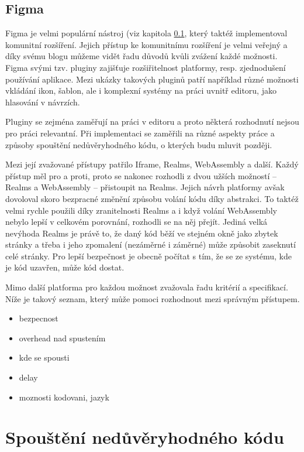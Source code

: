 \subsection{Figma}\label{text:figma}

Figma je velmi populární nástroj (viz kapitola \ref{text:figma}, který taktéž implementoval komunitní rozšíření.
Jejich přístup ke komunitnímu rozšíření je velmi veřejný a díky svému blogu můžeme vidět řadu důvodů kvůli zvážení každé možnosti.
Figma svými tzv. pluginy zajišťuje rozšiřitelnost platformy, resp. zjednodušení používání aplikace.
Mezi ukázky takových pluginů patří například různé možnosti vkládání ikon, šablon, ale i komplexní systémy na práci uvnitř editoru, jako hlasování v návrzích.

Pluginy se zejména zaměřují na práci v editoru a proto některá rozhodnutí nejsou pro práci relevantní.
Při implementaci se zaměřili na různé aspekty práce a způsoby spouštění nedůvěryhodného kódu, o kterých budu mluvit později.

Mezi její zvažované přístupy patřilo Iframe, Realms, WebAssembly a další.
Každý přístup měl pro a proti, proto se nakonec rozhodli z dvou užších možností -- Realms a WebAssembly -- přistoupit na Realms.
Jejich návrh platformy avšak dovoloval skoro bezpracné změnění způsobu volání kódu díky abstrakci.
To taktéž velmi rychle použili díky zranitelnosti Realms a i když volání WebAssembly nebylo lepší v celkovém porovnání, rozhodli se na něj přejít.
Jediná velká nevýhoda Realms je právě to, že daný kód běží ve stejném okně jako zbytek stránky a třeba i jeho zpomalení (nezáměrné i záměrné) může způsobit zaseknutí celé stránky.
Pro lepší bezpečnost je obecně počítat s tím, že se ze systému, kde je kód uzavřen, může kód dostat.

Mimo další platforma pro každou možnost zvažovala řadu kritérií a specifikací. 
Níže je takový seznam, který může pomoci rozhodnout mezi správným přístupem.

\begin{itemize}
    \item bezpecnost
    \item overhead nad spustením
    \item kde se spousti
    \item delay
    \item moznosti kodovani, jazyk
\end{itemize}

\section{Spouštění nedůvěryhodného kódu}

